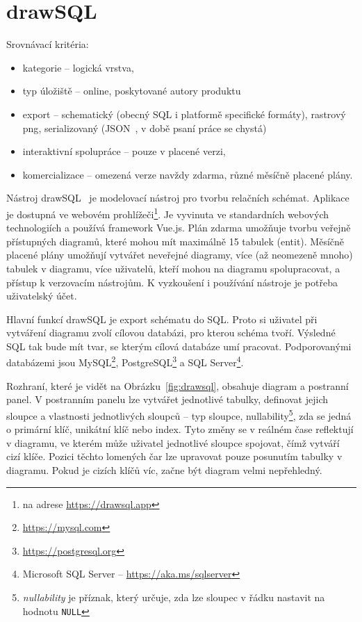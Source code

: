 \section{drawSQL}

Srovnávací kritéria:
\begin{itemize}
  \item kategorie -- logická vrstva,
  \item typ úložiště -- online, poskytované autory produktu
  \item export -- schematický (obecný SQL i platformě specifické formáty), rastrový \acrshort{png}, serializovaný (JSON~\cite{tc39group_jsondata_2017}, v době psaní práce se chystá)
  \item interaktivní spolupráce -- pouze v placené verzi,
  \item komercializace -- omezená verze navždy zdarma, různé měsíčně placené plány.
\end{itemize}

Nástroj drawSQL~\cite{drawsql_2021} je modelovací nástroj pro tvorbu relačních schémat.
Aplikace je dostupná ve webovém prohlížeči\footnote{na adrese \url{https://drawsql.app}}.
Je vyvinuta ve standardních webových technologiích a používá framework Vue.js.
Plán zdarma umožňuje tvorbu veřejně přístupných diagramů, které mohou mít maximálně 15 tabulek (entit).
Měsíčně placené plány umožňují vytvářet neveřejné diagramy, více (až neomezeně mnoho) tabulek v diagramu, více uživatelů, kteří mohou na diagramu spolupracovat, a přístup k verzovacím nástrojům.
K vyzkoušení i používání nástroje je potřeba uživatelský účet.

Hlavní funkcí drawSQL je export schématu do SQL.
Proto si uživatel při vytváření diagramu zvolí cílovou databázi, pro kterou schéma tvoří.
Výsledné SQL tak bude mít tvar, se kterým cílová databáze umí pracovat.
Podporovanými databázemi jsou
MySQL\footnote{\url{https://mysql.com}},
PostgreSQL\footnote{\url{https://postgresql.org}}
a SQL Server\footnote{Microsoft SQL Server -- \url{https://aka.ms/sqlserver}}.

Rozhraní, které je vidět na Obrázku~\ref{fig:drawsql}, obsahuje diagram a postranní panel.
V postranním panelu lze vytvářet jednotlivé tabulky, definovat jejich sloupce a vlastnosti jednotlivých sloupců -- typ sloupce,
nullability\footnote{\emph{nullability} je příznak, který určuje, zda lze sloupec v řádku nastavit na hodnotu \texttt{NULL}},
zda se jedná o primární klíč, unikátní klíč nebo index.
Tyto změny se v reálném čase reflektují v diagramu, ve kterém může uživatel jednotlivé sloupce spojovat, čímž vytváří cizí klíče.
Pozici těchto lomených čar lze upravovat pouze posunutím tabulky v diagramu.
Pokud je cizích klíčů víc, začne být diagram velmi nepřehledný.

